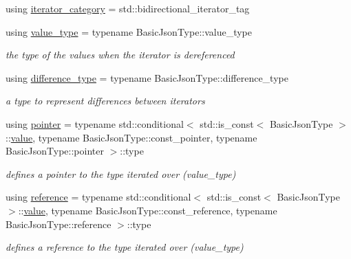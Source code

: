 \begin{DoxyCompactItemize}
\item 
using \hyperlink{classnlohmann_1_1detail_1_1iter__impl_ad9e091f5c70b34b5b1abc1ab15fd9106}{iterator\+\_\+category} = std\+::bidirectional\+\_\+iterator\+\_\+tag
\item 
using \hyperlink{classnlohmann_1_1detail_1_1iter__impl_ab35586a44f2222272c5346baa3013f67}{value\+\_\+type} = typename Basic\+Json\+Type\+::value\+\_\+type
\begin{DoxyCompactList}\small\item\em the type of the values when the iterator is dereferenced \end{DoxyCompactList}\item 
using \hyperlink{classnlohmann_1_1detail_1_1iter__impl_a2f7ea9f7022850809c60fc3263775840}{difference\+\_\+type} = typename Basic\+Json\+Type\+::difference\+\_\+type
\begin{DoxyCompactList}\small\item\em a type to represent differences between iterators \end{DoxyCompactList}\item 
using \hyperlink{classnlohmann_1_1detail_1_1iter__impl_a69e52f890ce8c556fd68ce109e24b360}{pointer} = typename std\+::conditional$<$ std\+::is\+\_\+const$<$ Basic\+Json\+Type $>$\+::\hyperlink{classnlohmann_1_1detail_1_1iter__impl_adc4048d25e057ce8ec0b912642c24731}{value}, typename Basic\+Json\+Type\+::const\+\_\+pointer, typename Basic\+Json\+Type\+::pointer $>$\+::type
\begin{DoxyCompactList}\small\item\em defines a pointer to the type iterated over (value\+\_\+type) \end{DoxyCompactList}\item 
using \hyperlink{classnlohmann_1_1detail_1_1iter__impl_a5be8001be099c6b82310f4d387b953ce}{reference} = typename std\+::conditional$<$ std\+::is\+\_\+const$<$ Basic\+Json\+Type $>$\+::\hyperlink{classnlohmann_1_1detail_1_1iter__impl_adc4048d25e057ce8ec0b912642c24731}{value}, typename Basic\+Json\+Type\+::const\+\_\+reference, typename Basic\+Json\+Type\+::reference $>$\+::type
\begin{DoxyCompactList}\small\item\em defines a reference to the type iterated over (value\+\_\+type) \end{DoxyCompactList}\end{DoxyCompactItemize}
